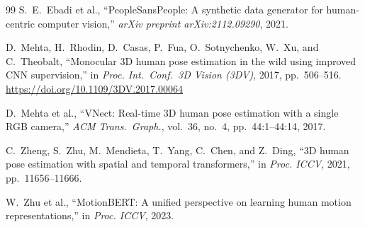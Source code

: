 \documentclass[twocolumn]{article}
\begin{document}
\begin{thebibliography}{99}
S.~E.~Ebadi et al.,
``PeopleSansPeople: A synthetic data generator for human-centric
computer vision,''
\textit{arXiv preprint arXiv:2112.09290}, 2021.

D.~Mehta, H.~Rhodin, D.~Casas, P.~Fua, O.~Sotnychenko, W.~Xu,
and C.~Theobalt,
``Monocular 3D human pose estimation in the wild using improved CNN
supervision,''
in \textit{Proc. Int.\ Conf.\ 3D Vision (3DV)}, 2017, pp.~506--516.
\url{https://doi.org/10.1109/3DV.2017.00064}

D.~Mehta et al.,
``VNect: Real-time 3D human pose estimation with a single RGB camera,''
\textit{ACM Trans.\ Graph.}, vol.~36, no.~4, pp.~44:1--44:14, 2017.

C.~Zheng, S.~Zhu, M.~Mendieta, T.~Yang, C.~Chen, and Z.~Ding,
``3D human pose estimation with spatial and temporal transformers,''
in \textit{Proc. ICCV}, 2021, pp.~11656--11666.

W.~Zhu et al.,
``MotionBERT: A unified perspective on learning human motion
representations,''
in \textit{Proc. ICCV}, 2023.

\end{thebibliography}
\end{document}
